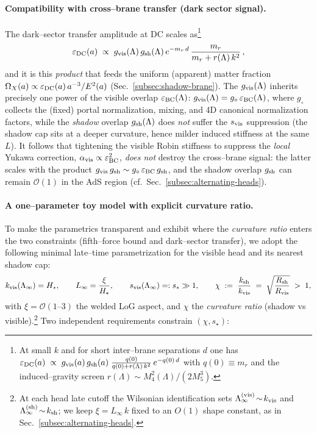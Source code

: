 \documentclass[10pt]{article}
\theoremstyle{definition}
\theoremstyle{plain}
\begin{document}
\paragraph{Compatibility with cross–brane transfer (dark sector signal).}\label{par:uom-main-104}
The dark–sector transfer amplitude at DC scales as\footnote{At small $k$ and for short inter–brane separations $d$ one has
\(\varepsilon_{\rm DC}(a)\;\propto\; g_{\rm vis}(a)\,g_{\rm sh}(a)\;\frac{q(0)}{q(0)+r(\Lambda)\,k^2}\,e^{-q(0)\,d}\) with $q(0)\equiv m_r$ and the induced–gravity screen $r(\Lambda)\sim M_4^2(\Lambda)/(2M_5^3)$.}
\begin{equation}
\varepsilon_{\rm DC}(a)\;\propto\; g_{\rm vis}(\Lambda)\,g_{\rm sh}(\Lambda)\,e^{-m_r\,d}\,\frac{m_r}{m_r+r(\Lambda)\,k^2}\,,
\label{eq:epsDC}
\end{equation}
and it is this \emph{product} that feeds the uniform (apparent) matter fraction $\Omega_X(a)\propto \varepsilon_{\rm DC}(a)\,a^{-3}/E^2(a)$ (Sec.~\ref{subsec:shadow-brane}).
The $g_{\rm vis}(\Lambda)$ inherits precisely one power of the visible overlap $\varepsilon_{\rm BC}(\Lambda)$:
\(
g_{\rm vis}(\Lambda)=g_\circ\,\varepsilon_{\rm BC}(\Lambda)
\),
where $g_\circ$ collects the (fixed) portal normalization, mixing, and 4D canonical normalization factors, while the
\emph{shadow} overlap $g_{\rm sh}(\Lambda)$ does \emph{not} suffer the $s_{\rm vis}$ suppression (the shadow cap sits at a deeper curvature, hence milder induced stiffness at the same $L$).
It follows that tightening the visible Robin stiffness to suppress the \emph{local} Yukawa correction, $\alpha_{\rm vis}\propto \varepsilon_{\rm BC}^2$,
\emph{does not} destroy the cross–brane signal: the latter scales with the product \(g_{\rm vis}\,g_{\rm sh}\sim g_\circ\,\varepsilon_{\rm BC}\,g_{\rm sh}\),
and the shadow overlap $g_{\rm sh}$ can remain \(\mathcal O(1)\) in the AdS region (cf.\ Sec.~\ref{subsec:alternating-heads}).

\paragraph{A one–parameter toy model with explicit curvature ratio.}\label{par:uom-main-105}
To make the parametrics transparent and exhibit where the \emph{curvature ratio} enters the two constraints
(fifth–force bound and dark–sector transfer), we adopt the following minimal late--time parametrization for the
visible head and its nearest shadow cap:
\begin{equation}
k_{\rm vis}(\Lambda_\infty)=H_\star,\qquad
L_\infty=\frac{\xi}{H_\star},\qquad
s_{\rm vis}(\Lambda_\infty)=:s_\star\gg 1,
\qquad
\chi\;:=\;\frac{k_{\rm sh}}{k_{\rm vis}}\;=\;\sqrt{\frac{R_{\rm sh}}{R_{\rm vis}}}\;>\;1,
\label{eq:KR-toy-defs}
\end{equation}
with \(\xi=\mathcal O(1\text{--}3)\) the welded LoG aspect, and \(\chi\) the \emph{curvature ratio} (shadow vs visible).\footnote{At each
head late cutoff the Wilsonian identification sets \(\Lambda_\infty^{\rm (vis)}\!\sim\!k_{\rm vis}\) and
\(\Lambda_\infty^{\rm (sh)}\!\sim\!k_{\rm sh}\); we keep \(\xi=L_\infty\,k\) fixed to an $O(1)$ shape constant, as in
Sec.~\ref{subsec:alternating-heads}.}
Two independent requirements constrain \((\chi,s_\star)\):
\end{document}
